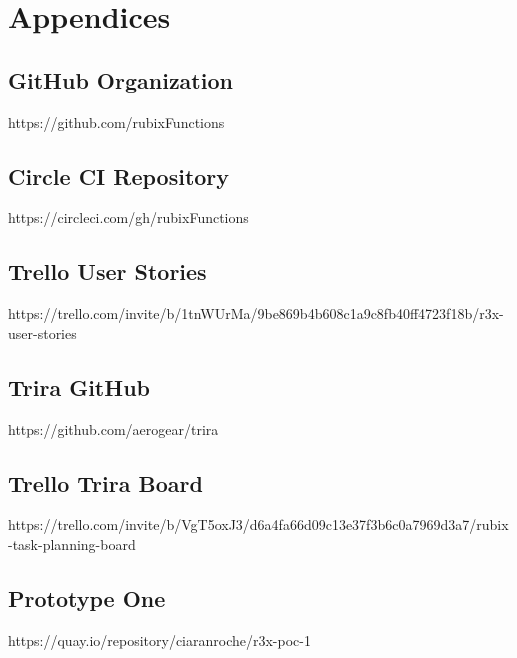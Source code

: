 \documentclass{article}
\begin{document}
\newpage


\newpage


\newpage


\newpage


\newpage


\newpage


\newpage



\newpage
\appendix
\section*{Appendices}
\renewcommand{\thesubsection}{\Alph{subsection}}

\subsection{GitHub Organization} 
\label{appendix:githuborg}
https://github.com/rubixFunctions

\subsection{Circle CI Repository} 
\label{appendix:circleci}
https://circleci.com/gh/rubixFunctions

\subsection{Trello User Stories}
\label{appendix:trellouser}
https://trello.com/invite/b/1tnWUrMa/9be869b4b608c1a9c8fb40ff4723f18b/r3x-user-stories

\subsection{Trira GitHub}
\label{appendix:triragithub}
https://github.com/aerogear/trira

\subsection{Trello Trira Board}
\label{appendix:trellotrira}
https://trello.com/invite/b/VgT5oxJ3/d6a4fa66d09c13e37f3b6c0a7969d3a7/rubix-task-planning-board

\subsection{Prototype One}
\label{appendix:proto1}
https://quay.io/repository/ciaranroche/r3x-poc-1
\end{document}
